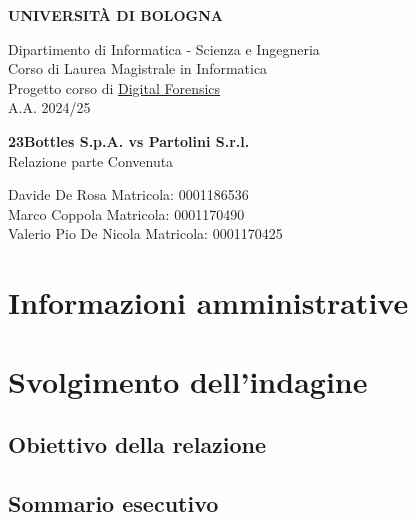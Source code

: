 \documentclass[a4paper,12pt]{report}
\begin{document}
\begin{titlepage}
    \centering
    \vspace*{0.1cm}

    \Huge
    \textbf{UNIVERSITÀ DI BOLOGNA}

    \vspace{1cm}
    \Large
    Dipartimento di Informatica - Scienza e Ingegneria \\
    Corso di Laurea Magistrale in Informatica \\\vspace{1cm}
    Progetto corso di \href{https://www.unibo.it/it/studiare/dottorati-master-specializzazioni-e-altra-formazione/insegnamenti/insegnamento/2024/479039}{Digital Forensics} \\
    A.A. 2024/25

    \vspace{5.5cm}
    \textbf{\LARGE 23Bottles S.p.A. vs Partolini S.r.l.}\\\vspace{0.3cm}
    \Large Relazione parte Convenuta

    \vfill

    \vfill

    \large
    Davide De Rosa \hfill Matricola: 0001186536\\
    Marco Coppola \hfill Matricola: 0001170490\\
    Valerio Pio De Nicola \hfill Matricola: 0001170425\\
\end{titlepage}

\tableofcontents
\newpage

\chapter{Informazioni amministrative}


\pagebreak

\chapter{Svolgimento dell'indagine}


\section{Obiettivo della relazione}


\section{Sommario esecutivo}

\end{document}
